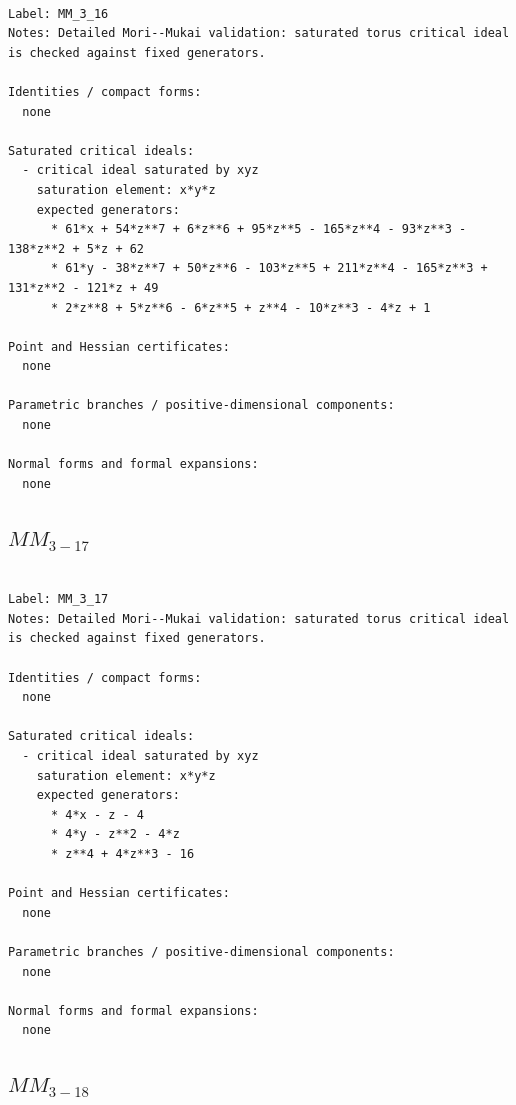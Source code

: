 \documentclass[10pt,a4paper]{article}
\begin{document}
\begin{lstlisting}

Label: MM_3_16
Notes: Detailed Mori--Mukai validation: saturated torus critical ideal is checked against fixed generators.

Identities / compact forms:
  none

Saturated critical ideals:
  - critical ideal saturated by xyz
    saturation element: x*y*z
    expected generators:
      * 61*x + 54*z**7 + 6*z**6 + 95*z**5 - 165*z**4 - 93*z**3 - 138*z**2 + 5*z + 62
      * 61*y - 38*z**7 + 50*z**6 - 103*z**5 + 211*z**4 - 165*z**3 + 131*z**2 - 121*z + 49
      * 2*z**8 + 5*z**6 - 6*z**5 + z**4 - 10*z**3 - 4*z + 1

Point and Hessian certificates:
  none

Parametric branches / positive-dimensional components:
  none

Normal forms and formal expansions:
  none

\end{lstlisting}

\subsection*{$ MM_{3-17} $}

\begin{lstlisting}

Label: MM_3_17
Notes: Detailed Mori--Mukai validation: saturated torus critical ideal is checked against fixed generators.

Identities / compact forms:
  none

Saturated critical ideals:
  - critical ideal saturated by xyz
    saturation element: x*y*z
    expected generators:
      * 4*x - z - 4
      * 4*y - z**2 - 4*z
      * z**4 + 4*z**3 - 16

Point and Hessian certificates:
  none

Parametric branches / positive-dimensional components:
  none

Normal forms and formal expansions:
  none

\end{lstlisting}

\subsection*{$ MM_{3-18} $}
\end{document}
